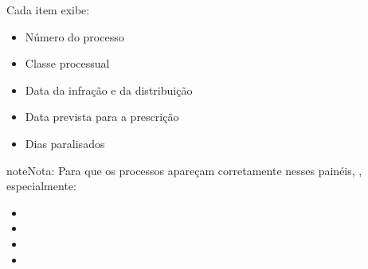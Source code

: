 \documentclass[letterpaper,10pt,brazil]{sphinxmanual}
\begin{document}
\sphinxAtStartPar
Cada item exibe:
\begin{itemize}
\item {} 
\sphinxAtStartPar
Número do processo

\item {} 
\sphinxAtStartPar
Classe processual

\item {} 
\sphinxAtStartPar
Data da infração e da distribuição

\item {} 
\sphinxAtStartPar
Data prevista para a prescrição

\item {} 
\sphinxAtStartPar
Dias paralisados

\end{itemize}

\begin{sphinxadmonition}{note}{Nota:}
\sphinxAtStartPar
Para que os processos apareçam corretamente nesses painéis, , especialmente:
\begin{itemize}
\item {} 
\sphinxAtStartPar
{}

\item {} 
\sphinxAtStartPar
{}

\item {} 
\sphinxAtStartPar
{}

\item {} 
\sphinxAtStartPar
{}

\end{itemize}
\end{sphinxadmonition}
\end{document}
